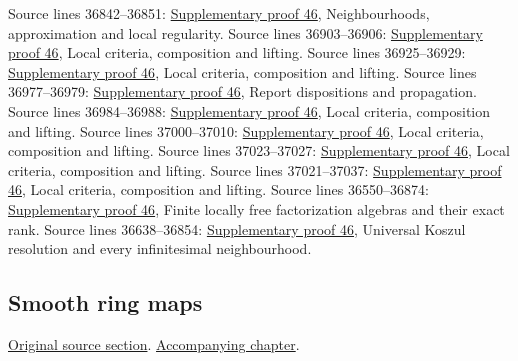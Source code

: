 \begin{AlgebraSourceRoutes}
 Source lines 36842--36851: \hyperlink{algebra_syntomic_notes_20260928}{Supplementary proof 46}, Neighbourhoods, approximation and local regularity.
 Source lines 36903--36906: \hyperlink{algebra_syntomic_notes_20260928}{Supplementary proof 46}, Local criteria, composition and lifting.
 Source lines 36925--36929: \hyperlink{algebra_syntomic_notes_20260928}{Supplementary proof 46}, Local criteria, composition and lifting.
 Source lines 36977--36979: \hyperlink{algebra_syntomic_notes_20260928}{Supplementary proof 46}, Report dispositions and propagation.
 Source lines 36984--36988: \hyperlink{algebra_syntomic_notes_20260928}{Supplementary proof 46}, Local criteria, composition and lifting.
 Source lines 37000--37010: \hyperlink{algebra_syntomic_notes_20260928}{Supplementary proof 46}, Local criteria, composition and lifting.
 Source lines 37023--37027: \hyperlink{algebra_syntomic_notes_20260928}{Supplementary proof 46}, Local criteria, composition and lifting.
 Source lines 37021--37037: \hyperlink{algebra_syntomic_notes_20260928}{Supplementary proof 46}, Local criteria, composition and lifting.
 Source lines 36550--36874: \hyperlink{algebra_syntomic_notes_20260928}{Supplementary proof 46}, Finite locally free factorization algebras and their exact rank.
 Source lines 36638--36854: \hyperlink{algebra_syntomic_notes_20260928}{Supplementary proof 46}, Universal Koszul resolution and every infinitesimal neighbourhood.
\end{AlgebraSourceRoutes}

\subsection{Smooth ring maps}
\hypertarget{algebra-source-section-smooth}{}
\noindent\href{https://github.com/stacks/stacks-project/blob/a04446e57ec1fbc252a871afcec7752fb2807b14/algebra.tex\#L37055}{Original source section}. \href{algebra.pdf\#nameddest=section-smooth}{Accompanying chapter}.

